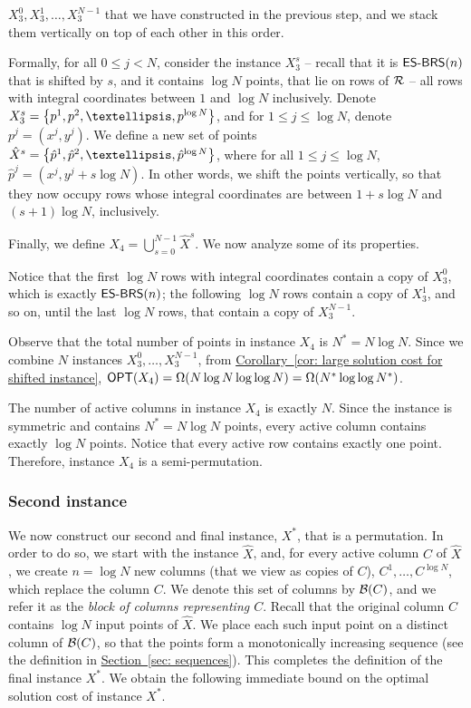 \documentclass[11pt]{article}
\numberwithin{equation}{section}
\theoremstyle{definition}
\theoremstyle{plain}
\newcommand{\expref}[2]{\hyperref[#2]{#1~\ref{#2}}}
\begin{document}
$X^0_3,X^1_3,\ldots,X^{N-1}_3$ that we have constructed in the previous step, and we stack them vertically on top of each other in this order. 

Formally, for all $0\leq j< N$, consider the instance $X^s_3$ -- recall that it is $\mbox{\sf{ES-BRS}}(n)$ that is shifted by $s$, and it contains $\log N$ points, that lie on rows of ${\mathcal R}$ -- all rows with integral coordinates between $1$ and $\log N$ inclusively.
Denote $X^s_3=\set{p^1,p^2,\ldots,p^{\log N}}$, and for $1\leq j\leq \log N$, denote $p^j=(x^j,y^j)$. We define a new set of points $\hat X^s=\set{\hat p^1,\hat p^2,\ldots,\hat p^{\log N}}$, where for all $1\leq j\leq \log N$, $\hat p^j=(x^j,y^j+s\log N)$. In other words, we shift the points vertically, so that they now occupy rows whose integral coordinates are between $1+s\log N$ and $(s+1)\log N$, inclusively.

Finally, we define $X_4=\bigcup_{s=0}^{N-1}\hat X^s$. We now analyze some of its properties.

Notice that the first $\log N$ rows with integral coordinates contain a copy of $X^0_3$, which is exactly $\mbox{\sf{ES-BRS}}(n)$; the following $\log N$ rows contain a copy of $X^1_3$, and so on, until the last $\log N$ rows, that contain a copy of $X^{N-1}_3$.

Observe that the total number of points in instance $X_4$ is $N^*=N\log N$. Since we combine $N$ instances $X^0_3,\ldots,X^{N-1}_3$, from \expref{Corollary}{cor: large solution cost for shifted instance}, $\mbox{\sf OPT}(X_4)=\Omega(N\log N\log\log N)=\Omega(N^*\log\log N^*)$. 

The number of active columns in instance $X_4$ is exactly $N$. Since the instance is symmetric and contains $N^*=N\log N$ points, every active column contains exactly $\log N$ points. Notice that every active row contains exactly one point. Therefore, instance $X_4$ is a semi-permutation.
\fi 



%
%
%
%
%
%
%
\subsubsection{Second instance}


We now construct our second and final instance, $X^*$, that is a permutation. 
In order to do so, we start with the instance $\hat{X}$, and, for every active column $C$ of $\hat{X}$, we create $n= \log N$ new columns (that we view as copies of $C$), $C^1,\ldots,C^{\log N}$, which replace the column $C$. 
We denote this set of columns by ${\mathcal{B}}(C)$, and we refer it as the \emph{block of columns representing $C$}. 
Recall that the original column $C$ contains $\log N$ input points of $\hat{X}$. 
We place each such input point on a distinct column of ${\mathcal{B}}(C)$, so that the points form a monotonically increasing sequence (see the definition in \expref{Section}{sec: sequences}). This completes the definition of the final instance $X^*$.
%
We obtain the following immediate bound on the optimal solution cost of instance $X^*$.
\end{document}
